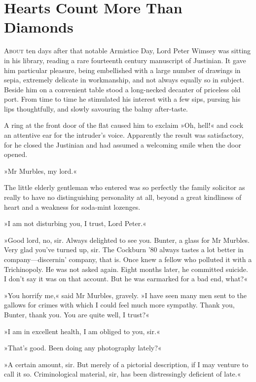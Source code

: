 \chapter{Hearts Count More Than Diamonds}
\lettrine[lines=4]{A}{bout} ten days after that notable Armistice Day, Lord Peter Wimsey was sitting in his library, reading a rare fourteenth century manuscript of Justinian. It gave him particular pleasure, being embellished with a large number of drawings in sepia, extremely delicate in workmanship, and not always equally so in subject. Beside him on a convenient table stood a long-necked decanter of priceless old port. From time to time he stimulated his interest with a few sips, pursing his lips thoughtfully, and slowly savouring the balmy after-taste.

A ring at the front door of the flat caused him to exclaim »Oh, hell!« and cock an attentive ear for the intruder's voice. Apparently the result was satisfactory, for he closed the Justinian and had assumed a welcoming smile when the door opened.

»Mr Murbles, my lord.«

The little elderly gentleman who entered was so perfectly the family solicitor as really to have no distinguishing personality at all, beyond a great kindliness of heart and a weakness for soda-mint lozenges.

»I am not disturbing you, I trust, Lord Peter.«

»Good lord, no, sir. Always delighted to see you. Bunter, a glass for Mr Murbles. Very glad you've turned up, sir. The Cockburn '80 always tastes a lot better in company—discernin' company, that is. Once knew a fellow who polluted it with a Trichinopoly. He was not asked again. Eight months later, he committed suicide. I don't say it was on that account. But he was earmarked for a bad end, what?«

»You horrify me,« said Mr Murbles, gravely. »I have seen many men sent to the gallows for crimes with which I could feel much more sympathy. Thank you, Bunter, thank you. You are quite well, I trust?«

»I am in excellent health, I am obliged to you, sir.«

»That's good. Been doing any photography lately?«

»A certain amount, sir. But merely of a pictorial description, if I may venture to call it so. Criminological material, sir, has been distressingly deficient of late.«

